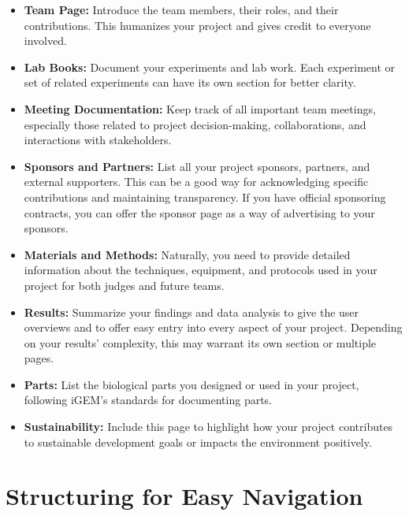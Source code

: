 \begin{itemize}
    \item \textbf{Team Page:} Introduce the team members, their roles, and their contributions.
    This humanizes your project and gives credit to everyone involved.

    \item \textbf{Lab Books:} Document your experiments and lab work.
    Each experiment or set of related experiments can have its own section for better clarity.

    \item \textbf{Meeting Documentation:} Keep track of all important team meetings, especially those related to project decision-making, collaborations, and interactions with stakeholders.

    \item \textbf{Sponsors and Partners:} List all your project sponsors, partners, and external supporters.
    This can be a good way for acknowledging specific contributions and maintaining transparency.
    If you have official sponsoring contracts, you can offer the sponsor page as a way of advertising to your sponsors.

    \item \textbf{Materials and Methods:} Naturally, you need to provide detailed information about the techniques, equipment, and protocols used in your project for both judges and future teams.

    \item \textbf{Results:} Summarize your findings and data analysis to give the user overviews and to offer easy entry into every aspect of your project.
    Depending on your results' complexity, this may warrant its own section or multiple pages.

    \item \textbf{Parts:} List the biological parts you designed or used in your project, following iGEM’s standards for documenting parts.

    \item \textbf{Sustainability:} Include this page to highlight how your project contributes to sustainable development goals or impacts the environment positively.
\end{itemize}


\section{Structuring for Easy Navigation}

